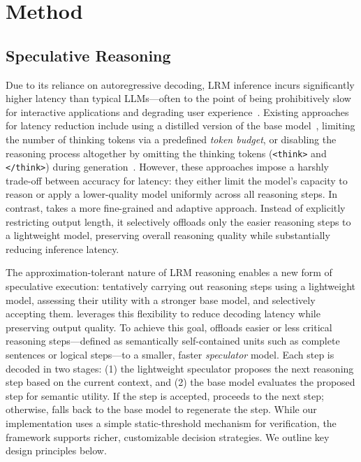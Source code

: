 \section{Method}


\subsection{Speculative Reasoning}
\label{sec:spec_reason}

Due to its reliance on autoregressive decoding, LRM inference incurs significantly higher latency than typical LLMs---often to the point of being prohibitively slow for interactive applications and degrading user experience~\citep{dynasor_cot}. Existing approaches for latency reduction include using a distilled version of the base model~\citep{deepseek_r1}, limiting the number of thinking tokens via a predefined {\em token budget}, or disabling the reasoning process altogether by omitting the thinking tokens (\texttt{<think>} and \texttt{</think>}) during generation~\citep{qwen3}. However, these approaches impose a harshly trade-off between accuracy for latency: they either limit the model's capacity to reason or apply a lower-quality model uniformly across all reasoning steps.
In contrast, \name{} takes a more fine-grained and adaptive approach. Instead of explicitly restricting output length, it selectively offloads only the easier reasoning steps to a lightweight model, preserving overall reasoning quality while substantially reducing inference latency.

The approximation-tolerant nature of LRM reasoning enables a new form of speculative execution: tentatively carrying out reasoning steps using a lightweight model, assessing their utility with a stronger base model, and selectively accepting them. \name{} leverages this flexibility to reduce decoding latency while preserving output quality.
To achieve this goal, \name{} offloads easier or less critical reasoning steps---defined as semantically self-contained units such as complete sentences or logical steps---to a smaller, faster {\em speculator} model. Each step is decoded in two stages: (1) the lightweight speculator proposes the next reasoning step based on the current context, and (2) the base model evaluates the proposed step for semantic utility. If the step is accepted, \name{} proceeds to the next step; otherwise, \name{} falls back to the base model to regenerate the step. While our implementation uses a simple static-threshold mechanism for verification, the framework supports richer, customizable decision strategies. We outline key design principles below.

